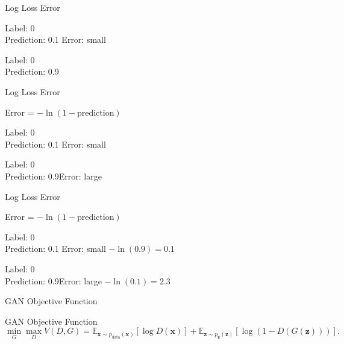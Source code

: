 \documentclass{beamer}
\begin{document}
\begin{frame}{Log Loss Error}
    

\begin{flushleft}
    \Large Label: 0 \\
    \Large Prediction: 0.1 \hfill Error: small \hfill 
\end{flushleft}

\begin{flushleft}
    \Large Label: 0\\
    \Large Prediction: 0.9 \hfill
\end{flushleft}
\end{frame}

\begin{frame}{Log Loss Error}
    \begin{center}
    \Large Error = $-\ln(1-\text{prediction})$
\end{center}

\begin{flushleft}
    \Large Label: 0 \\
    \Large Prediction: 0.1 \hfill Error: small 
\end{flushleft}

\begin{flushleft}
    \Large Label: 0\\
    \Large Prediction: 0.9\hfill Error: large
\end{flushleft}
\end{frame}

\begin{frame}{Log Loss Error}
    \begin{center}
    \Large Error = $-\ln(1-\text{prediction})$
\end{center}

\begin{flushleft}
    \Large Label: 0 \\
    \Large Prediction: 0.1 \hfill Error: small \hfill $-\ln(0.9) = 0.1$
\end{flushleft}

\begin{flushleft}
    \Large Label: 0\\
    \Large Prediction: 0.9\hfill Error: large \hfill $-\ln(0.1) = 2.3$
\end{flushleft}
\end{frame}

\begin{frame}{GAN Objective Function}

\begin{block}{GAN Objective Function}
\[
\min_G \max_D V(D, G) = \mathbb{E}_{\mathbf{x} \sim p_{\text{data}}(\mathbf{x})} [\log D(\mathbf{x})] + 
\mathbb{E}_{\mathbf{z} \sim p_{\mathbf{z}}(\mathbf{z})} [\log (1 - D(G(\mathbf{z})))].
\]
\end{block}
    
\end{frame}
\end{document}
